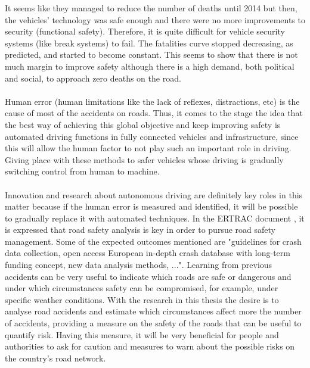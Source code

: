     It seems like they managed to reduce the number of deaths until 2014 but then, the vehicles' technology was safe enough and there were no more improvements to security (functional safety). Therefore, it is quite difficult for vehicle security systems (like break systems) to fail. The fatalities curve stopped decreasing, as predicted, and started to become constant. This seems to show that there is not much margin to improve safety although there is a high demand, both political and social, to approach zero deaths on the road. \\
    \\
    Human error (human limitations like the lack of reflexes, distractions, etc) is the cause of most of the accidents on roads. Thus, it comes to the stage the idea that the best way of achieving this global objective and keep improving safety is automated driving functions in fully connected vehicles and infrastructure, since this will allow the human factor to not play such an important role in driving. Giving place with these methods to safer vehicles whose driving is gradually switching control from human to machine.
    \\
    \\
    Innovation and research about autonomous driving are definitely key roles in this matter because if the human error is measured and identified, it will be possible to gradually replace it with automated techniques. In the \ac{ERTRAC} document \cite{ertrac}, it is expressed that road safety analysis is key in order to pursue road safety management. Some of the expected outcomes mentioned are "guidelines for crash data collection, open access European in-depth crash database with long-term funding concept, new data analysis methods, ...". Learning from previous accidents can be very useful to indicate which roads are safe or dangerous and under which circumstances safety can be compromised, for example, under specific weather conditions. With the research in this thesis the desire is to analyse road accidents and estimate which circumstances affect more the number of accidents, providing a measure on the safety of the roads that can be useful to quantify risk. Having this measure, it will be very beneficial for people and authorities to ask for caution and measures to warn about the possible risks on the country's road network. 
